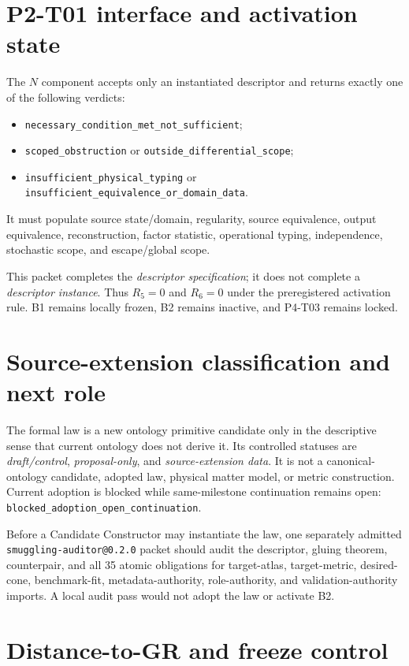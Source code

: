 \documentclass[11pt]{article}
\theoremstyle{definition}
\theoremstyle{plain}
\begin{document}
\section{P2-T01 interface and activation state}

The $N$ component accepts only an instantiated descriptor and returns exactly
one of the following verdicts:
\begin{itemize}[leftmargin=2em]
  \item \nolinkurl{necessary_condition_met_not_sufficient};
  \item \nolinkurl{scoped_obstruction} or
        \nolinkurl{outside_differential_scope};
  \item \nolinkurl{insufficient_physical_typing} or
        \nolinkurl{insufficient_equivalence_or_domain_data}.
\end{itemize}
It must populate source state/domain, regularity, source equivalence, output
equivalence, reconstruction, factor statistic, operational typing,
independence, stochastic scope, and escape/global scope.

This packet completes the \emph{descriptor specification}; it does not
complete a \emph{descriptor instance}. Thus $R_5=0$ and $R_6=0$ under the
preregistered activation rule. B1 remains locally frozen, B2 remains inactive,
and P4-T03 remains locked.

\section{Source-extension classification and next role}

The formal law is a new ontology primitive candidate only in the descriptive
sense that current ontology does not derive it. Its controlled statuses are
\emph{draft/control}, \emph{proposal-only}, and \emph{source-extension data}.
It is not a canonical-ontology candidate, adopted law, physical matter model,
or metric construction. Current adoption is blocked while same-milestone
continuation remains open:
\nolinkurl{blocked_adoption_open_continuation}.

Before a Candidate Constructor may instantiate the law, one separately
admitted \texttt{smuggling-auditor@0.2.0} packet should audit the descriptor,
gluing theorem, counterpair, and all 35 atomic obligations for target-atlas,
target-metric, desired-cone, benchmark-fit, metadata-authority, role-authority,
and validation-authority imports. A local audit pass would not adopt the law
or activate B2.

\section{Distance-to-GR and freeze control}
\end{document}

